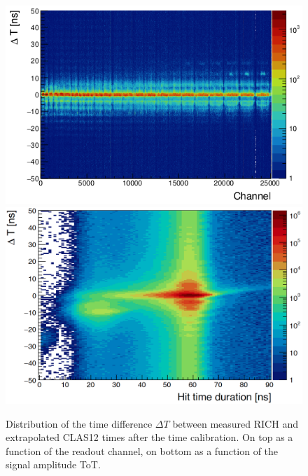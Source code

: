 \documentclass[5p,times,twocolumn]{elsarticle}
\def\dT{$\Delta T$ }
\begin{document}
\begin{figure}[t]
\begin{center}
\includegraphics[width=0.9\columnwidth]{dt_vs_anode_cor.png}
\includegraphics[width=0.9\columnwidth]{dt_vs_dur_cor.png}
\end{center}
\caption{Distribution of the time difference \dT between measured RICH and extrapolated CLAS12 times after the time calibration. On top as a function of the readout channel, on bottom as a function of the signal amplitude ToT.}
\label{Fig:DT_corr}
\end{figure}
\end{document}
